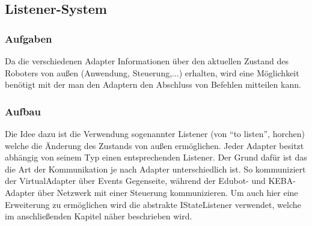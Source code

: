 \subsection{Listener-System}

\subsubsection{Aufgaben}
Da die verschiedenen Adapter Informationen über den aktuellen Zustand des Roboters von außen (Anwendung, Steuerung,...) erhalten, wird eine Möglichkeit benötigt mit der man den Adaptern den Abschluss von Befehlen mitteilen kann.

\subsubsection{Aufbau}
Die Idee dazu ist die Verwendung sogenannter Listener (von “to listen”, horchen) welche die Änderung des Zustands von außen ermöglichen. Jeder Adapter besitzt abhängig von seinem Typ einen entsprechenden Listener. Der Grund dafür ist das die Art der Kommunikation je nach Adapter unterschiedlich ist. So kommuniziert der VirtualAdapter über Events Gegenseite, während der Edubot- und KEBA-Adapter über Netzwerk mit einer Steuerung kommunizieren. Um auch hier eine Erweiterung zu ermöglichen wird die abstrakte IStateListener verwendet, welche im anschließenden Kapitel näher beschrieben wird.

